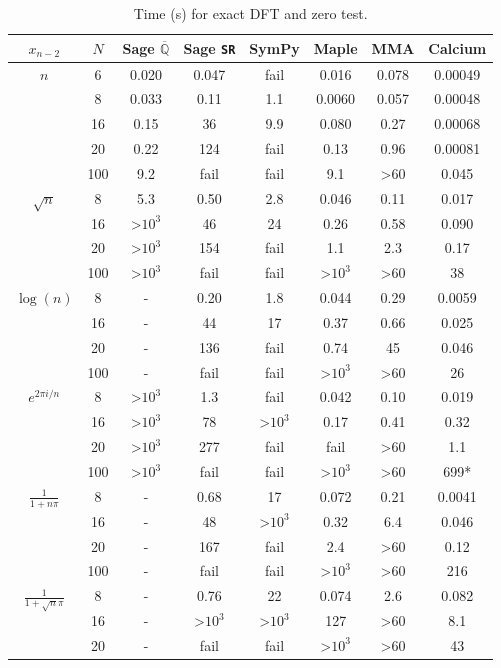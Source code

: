 \documentclass[sigconf,screen,urlbreakonhyphens]{acmart}
\begin{document}
{\renewcommand{\arraystretch}{0.9}
\begin{table}
\caption{Time (s) for exact DFT and zero test.}
\label{tab:dft}
\begin{tabular}{ c c c c c c c c }
$x_{n-2}$  & $N$ & \!\!Sage $\overline{\mathbb{Q}}$\!\! & \!\!Sage \texttt{SR}\!\! & \!\!SymPy\!\! & \!\!Maple\!\! & \!\!MMA\!\! & \!\!Calcium\!\! \\
 \hline
\multirow{4}{*}{$n$} & 6   & 0.020 & 0.047 & fail & 0.016 & 0.078   & 0.00049 \\
  & 8 & 0.033   & 0.11  & 1.1    & 0.0060 &  0.057 & 0.00048 \\
  & 16  & 0.15  & 36    & 9.9    & 0.080 &  0.27    & 0.00068 \\
  & 20  & 0.22  & 124   & fail   & 0.13 &  0.96    & 0.00081 \\
  & 100 & 9.2   & fail  & fail   & 9.1 &  >60 & 0.045 \\
\hline
\multirow{4}{*}{$\sqrt{n}$} & 8  &   5.3  &   0.50  &   2.8   & 0.046 &   0.11  &   0.017 \\
 & 16  &   >$10^3$  &   46  &   24  & 0.26 &    0.58   &  0.090 \\
 & 20  &   >$10^3$  &   154 &    fail  & 1.1 &    2.3   &  0.17 \\
 & 100 &    >$10^3$  &   fail  &   fail  & >$10^3$ &    >60   &  38 \\
\hline
\multirow{4}{*}{$\log(n)$\!\!\!\!} & 8  &   -  &   0.20  &   1.8   & 0.044 &   0.29  &   0.0059 \\
 & 16  &   -  &   44  &   17 & 0.37 &     0.66  &   0.025 \\
 & 20  &   -  &   136   &  fail  & 0.74 &    45  &   0.046 \\
 & 100  &   - &    fail   &  fail  &  >$10^3$ &   >60  &   26 \\
\hline
\multirow{4}{*}{\!\!$e^{2\pi i/n}$\!\!\!\!\!\!} & 8  &   >$10^3$  &   1.3  &   fail  &  0.042 &   0.10  &   0.019 \\
  & 16  &   >$10^3$  &   78   &  >$10^3$  &  0.17 &   0.41  &   0.32 \\
  & 20  &   >$10^3$  &   277   &  fail  &   fail &  >60  &   1.1 \\
  & 100 &    >$10^3$  &   fail  &   fail  &  >$10^3$ &   >60  &   699* \\
\hline
\multirow{4}{*}{\!\!$\frac{1}{1+n\pi}$\!\!\!\!\!\!} & 8  &   -   &  0.68  &   17  &  0.072 &   0.21  &   0.0041 \\
  & 16  &   -   &  48  &   >$10^3$  &  0.32 &   6.4  &   0.046 \\
  & 20  &   -   &  167   &  fail  &  2.4 &   >60  &   0.12 \\
  & 100  &   -  &   fail   &  fail  &  >$10^3$ &   >60  &   216 \\
\hline
\multirow{4}{*}{\!\!$\frac{1}{1+\sqrt{n} \pi}$\!\!\!\!\!\!} & 8  &   -  &   0.76  &   22  &  0.074 &   2.6 &    0.082 \\
  & 16  &   -  &   >$10^3$   &  >$10^3$  &  127 &   >60  &   8.1 \\
  & 20  &   -  &   fail   &  fail   &  >$10^3$ &  >60  &   43 \\
\end{tabular}
\end{table}
}
\end{document}
